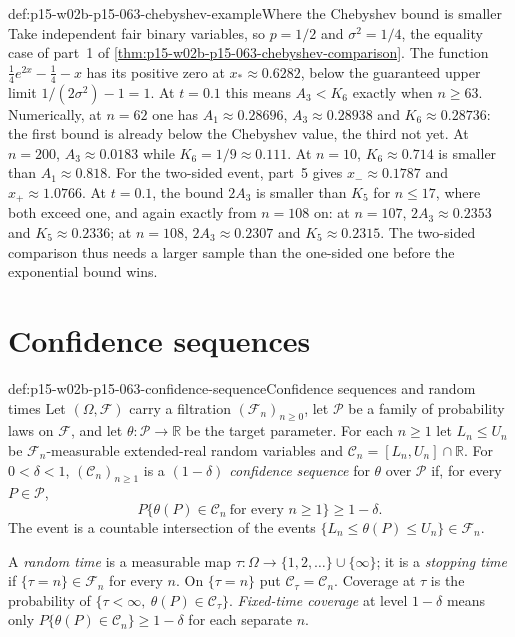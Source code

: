 \begin{hbexample}{def:p15-w02b-p15-063-chebyshev-example}{Where the Chebyshev bound is smaller}
Take independent fair binary variables, so \(p=1/2\) and
\(\sigma^2=1/4\), the equality case of part~1 of
\cref{thm:p15-w02b-p15-063-chebyshev-comparison}. The function
\(\tfrac14e^{2x}-\tfrac14-x\) has its positive zero at
\(x_*\approx0.6282\), below the guaranteed upper limit
\(1/(2\sigma^2)-1=1\). At \(t=0.1\) this means \(A_3<K_6\) exactly when
\(n\geq63\). Numerically, at \(n=62\) one has
\(A_1\approx0.28696\), \(A_3\approx0.28938\) and \(K_6\approx0.28736\):
the first bound is already below the Chebyshev value, the third not yet.
At \(n=200\), \(A_3\approx0.0183\) while \(K_6=1/9\approx0.111\). At
\(n=10\), \(K_6\approx0.714\) is smaller than \(A_1\approx0.818\).
For the two-sided event, part~5 gives \(x_-\approx0.1787\) and
\(x_+\approx1.0766\). At \(t=0.1\), the bound \(2A_3\) is smaller than
\(K_5\) for \(n\leq17\), where both exceed one, and again exactly from
\(n=108\) on: at \(n=107\), \(2A_3\approx0.2353\) and
\(K_5\approx0.2336\); at \(n=108\), \(2A_3\approx0.2307\) and
\(K_5\approx0.2315\). The two-sided comparison thus needs a larger sample
than the one-sided one before the exponential bound wins.
\end{hbexample}

\section{Confidence sequences}
\label{sec:p15-w02b-p15-063-confidence-sequences}

\begin{hbdefinition}{def:p15-w02b-p15-063-confidence-sequence}{Confidence sequences and random times}
Let \((\Omega,\mathcal F)\) carry a filtration
\((\mathcal F_n)_{n\geq0}\), let \(\mathcal P\) be a family of probability
laws on \(\mathcal F\), and let \(\theta:\mathcal P\to\mathbb R\) be the
target parameter. For each \(n\geq1\) let \(L_n\leq U_n\) be
\(\mathcal F_n\)-measurable extended-real random variables and
\(\mathcal C_n=[L_n,U_n]\cap\mathbb R\).
For \(0<\delta<1\), \((\mathcal C_n)_{n\geq1}\) is a
\emph{\((1-\delta)\) confidence sequence} for \(\theta\) over
\(\mathcal P\) if, for every \(P\in\mathcal P\),
\[
 P\{\theta(P)\in\mathcal C_n\ \text{for every }n\geq1\}\geq1-\delta .
\]
The event is a countable intersection of the events
\(\{L_n\leq\theta(P)\leq U_n\}\in\mathcal F_n\).

A \emph{random time} is a measurable map
\(\tau:\Omega\to\{1,2,\ldots\}\cup\{\infty\}\); it is a \emph{stopping
time} if \(\{\tau=n\}\in\mathcal F_n\) for every \(n\). On
\(\{\tau=n\}\) put \(\mathcal C_\tau=\mathcal C_n\). Coverage at
\(\tau\) is the probability of \(\{\tau<\infty,\ \theta(P)\in\mathcal
C_\tau\}\). \emph{Fixed-time coverage} at level \(1-\delta\) means only
\(P\{\theta(P)\in\mathcal C_n\}\geq1-\delta\) for each separate \(n\).
\end{hbdefinition}

